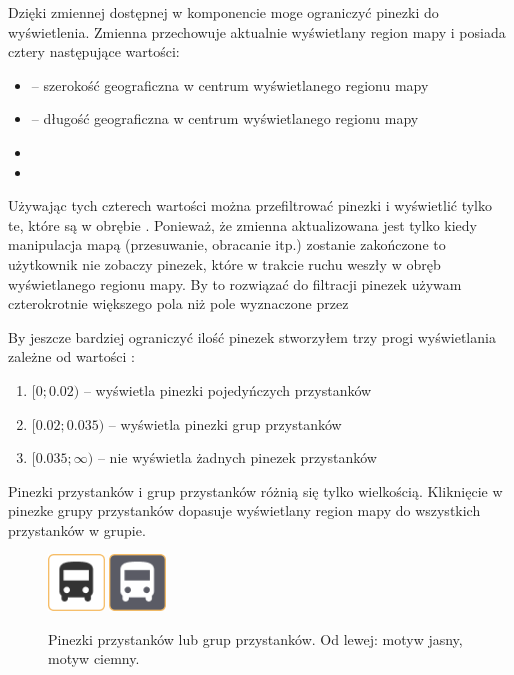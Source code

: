\documentclass{SGGW-thesis}
\begin{document}
Dzięki zmiennej  dostępnej w komponencie  moge ograniczyć pinezki do wyświetlenia.
Zmienna  przechowuje aktualnie wyświetlany region mapy i posiada cztery następujące wartości:
\begin{itemize}
  \item{ -- szerokość geograficzna w centrum wyświetlanego regionu mapy}
  \item{ -- długość geograficzna w centrum wyświetlanego regionu mapy}
  \item{}
  \item{}
\end{itemize}
Używając tych czterech wartości można przefiltrować pinezki i wyświetlić tylko te, które są w obrębie .
Ponieważ, że zmienna  aktualizowana jest tylko kiedy manipulacja mapą (przesuwanie, obracanie itp.) zostanie zakończone to użytkownik nie zobaczy pinezek,
które w trakcie ruchu weszły w obręb wyświetlanego regionu mapy.
By to rozwiązać do filtracji pinezek używam czterokrotnie większego pola niż pole wyznaczone przez 

By jeszcze bardziej ograniczyć ilość pinezek stworzyłem trzy progi wyświetlania zależne od wartości :
\begin{enumerate}
  \item{$[0;0.02)$ -- wyświetla pinezki pojedyńczych przystanków}
  \item{$[0.02; 0.035)$ -- wyświetla pinezki grup przystanków}
  \item{$[0.035;\infty)$ -- nie wyświetla żadnych pinezek przystanków}
\end{enumerate}


Pinezki przystanków i grup przystanków różnią się tylko wielkością.
Kliknięcie w pinezke grupy przystanków dopasuje wyświetlany region mapy do wszystkich przystanków w grupie.
\begin{figure}
  \centering
  \includegraphics[width=15mm]{screeny/busstop_jasny}
  \enspace\enspace
  \includegraphics[width=15mm]{screeny/busstop_ciemny}
  \caption[Pinezki przystanków]{
    \label{screen.topbox}
    Pinezki przystanków lub grup przystanków. Od lewej: motyw jasny, motyw ciemny. \vspace{2ex}
  }
\end{figure}
\end{document}
